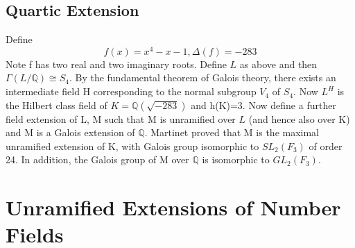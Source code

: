 \documentclass[12pt]{extarticle}
\newcommand{\<}{\langle}
\renewcommand{\>}{\rangle}
\theoremstyle{definition}
\begin{document}
\subsection{Quartic Extension}
Define  \begin{equation}
    f(x)=x^4-x-1, \Delta(f)=-283
\end{equation}
Note f has two real and two imaginary roots. Define $L$ as above and then $\Gamma(L/\mathbb{Q})\cong S_4$. By the fundamental theorem of Galois theory, there exists an intermediate field H corresponding to the normal subgroup $V_4$ of $S_4$. Now $L^H$ is the Hilbert class field of $K= \mathbb{Q}(\sqrt{-283})$ and h(K)=3. Now define a further field extension of L, M such that M is unramified over $L$ (and hence also over K) and M is a Galois extension of $\mathbb{Q}$. Martinet proved that M is the maximal unramified extension of K, with Galois group isomorphic to $SL_2(F_3)$ of order 24. In addition, the Galois group of M over $\mathbb{Q}$ is isomorphic to $GL_2(F_3)$. 
\begin{center}
\end{center}


\section{Unramified Extensions of Number Fields}
\end{document}
